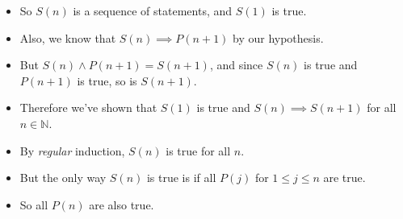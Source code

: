 \documentclass[
]{article}
\providecommand{\tightlist}{%
  \setlength{\itemsep}{0pt}\setlength{\parskip}{0pt}}
\begin{document}
\begin{itemize}
\tightlist
\item
  So \(S(n)\) is a sequence of statements, and \(S(1)\) is true.\\
\item
  Also, we know that \(S(n)\implies P(n+1)\) by our hypothesis.\\
\item
  But \(S(n)\wedge P(n+1)=S(n+1)\), and since \(S(n)\) is true and
  \(P(n+1)\) is true, so is \(S(n+1)\).\\
\item
  Therefore we've shown that \(S(1)\) is true and
  \(S(n)\implies S(n+1)\) for all \(n\in\mathbb{N}\).\\
\item
  By \emph{regular} induction, \(S(n)\) is true for all \(n\).\\
\item
  But the only way \(S(n)\) is true is if all \(P(j)\) for
  \(1\le j\le n\) are true.\\
\item
  So all \(P(n)\) are also true.
\end{itemize}
\end{document}
